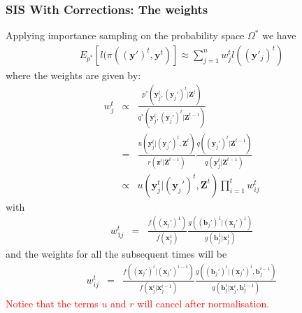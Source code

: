 \documentclass[9pt, xcolor={dvipsnames,svgnames,table}]{beamer}
\begin{document}
\begin{frame}
    \frametitle{SIS With Corrections: The weights}
    Applying importance sampling on the probability space $\Omega^*$ we have
    \begin{align*}
        E_{p^*}[l(\pi (\bm{(y')}^{t}, \bm{y}^{t})] 
        \approx \sum_{j=1}^n  w^{t}_j l((\bm{y}'_j)^{t})
    \end{align*}
    where the weights are given by:
    \begin{eqnarray*}
        w^{t}_j &\propto& \frac{p^*(\bm{y}_j^{t}, (\bm{y}_j')^{t} | \bm{Z}^{t})} {q^*(\bm{y}_j^{t}, (\bm{y}_j')^{t} |\bm{Z}^{t-1})} \\
        &=& \frac{u(\bm{y}_j^{t} | (\bm{y}_j')^{t}, \bm{Z}^{t})}{r(\bm{z}^{t} | \bm{Z}^{t-1})} \frac{q((\bm{y}_j')^{t} | \bm{Z}^{t-1})}{q(\bm{y}_j^{t} | \bm{Z}^{t-1})} \\
        & \propto & u(\bm{y}_j^{t} | (\bm{y}_j')^{t}, \bm{Z}^{t}) \prod_{i=1}^{t} w^{t}_{ij}
    \end{eqnarray*}
    with
    \begin{eqnarray*}
        w^{t}_{1j} &=& \frac{f((\bm{x}_j')^1)}{f(\bm{x}_j^1)} \frac{g((\bm{b}_j')^1 | (\bm{x}_j')^1)}{g(\bm{b}_j^1 | \bm{x}_j^1)}
    \end{eqnarray*}
    and the weights for all the subsequent times will be
    \begin{eqnarray*}
        w^{t}_{ij} &=& \frac{f((\bm{x}_j')^i | (\bm{x}_j')^{i-1})}{f(\bm{x}_j^i | \bm{x}_j^{i-1})} \frac{g((\bm{b}_j')^i | (\bm{x}_j')^i, \bm{b}_j^{i-1})}{g(\bm{b}_j^i | \bm{x}_j^i, \bm{b}_j^{i-1})}
    \end{eqnarray*}
    \textcolor{Red}{Notice that the terms $u$ and $r$ will cancel after normalisation.}
\end{frame}
\end{document}
